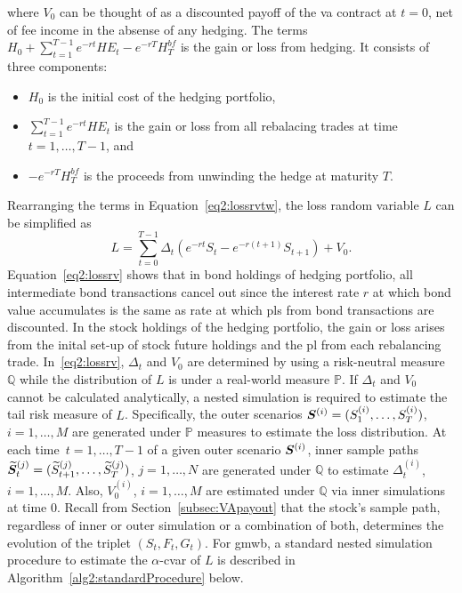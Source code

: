 where $V_0$ can be thought of as a discounted payoff of the \gls{va} contract at $t=0$, net of fee income in the absense of any hedging.
The terms $H_0 + \sum_{t=1}^{T-1} e^{-rt} HE_t - e^{-rT} H^{bf}_T$ is the gain or loss from hedging.
It consists of three components:
\begin{itemize}
    \item   $H_0$ is the initial cost of the hedging portfolio, 
    \item   $\sum_{t=1}^{T-1} e^{-rt} HE_t$ is the gain or loss from all rebalacing trades at time $t=1,\ldots,T-1$, and
    \item   $-e^{-rT} H^{bf}_T$ is the proceeds from unwinding the hedge at maturity $T$.
\end{itemize}
Rearranging the terms in Equation~\ref{eq2:lossrvtw}, the loss random variable $L$ can be simplified as
\begin{equation}\label{eq2:lossrv}
    L = \sum_{t=0}^{T-1}\Delta_t (e^{-rt}S_t - e^{-r(t+1)}S_{t+1}) + V_0.
\end{equation}
Equation~\ref{eq2:lossrv} shows that in bond holdings of hedging portfolio, all intermediate bond transactions cancel out since the interest rate $r$ at which bond value accumulates is the same as rate at which \gls{pl}s from bond transactions are discounted. 
In the stock holdings of the hedging portfolio, the gain or loss arises from the inital set-up of stock future holdings and the \gls{pl} from each rebalancing trade.
In~\eqref{eq2:lossrv}, $\Delta_t$ and $V_0$ are determined by using a risk-neutral measure $\mathbb{Q}$ while the distribution of $L$ is under a real-world measure $\mathbb{P}$.
If $\Delta_t$ and $V_0$ cannot be calculated analytically, a nested simulation is required to estimate the tail risk measure of $L$.
Specifically, the outer scenarios $\bm{S}^{(i)} = (S_{1}^{(i)},\ldots,S_{T}^{(i)})$, $i=1,\ldots,M$ are generated under $\mathbb{P}$ measures to estimate the loss distribution.
At each time~$t=1,\ldots,T-1$ of a given outer scenario $\bm{S}^{(i)}$, inner sample paths $\widetilde{\bm{S}}_{t}^{(j)} = (\widetilde{S}_{t+1}^{(j)},\ldots,\widetilde{S}_{T}^{(j)})$, $j=1,\ldots,N$ are generated under $\mathbb{Q}$ to estimate $\Delta_t^{(i)}$, $i=1,\ldots,M$.
Also, $V_0^{(i)}$, $i=1,\ldots,M$ are estimated under $\mathbb{Q}$ via inner simulations at time $0$.
Recall from Section~\ref{subsec:VApayout} that the stock's sample path, regardless of inner or outer simulation or a combination of both, determines the evolution of the triplet $(S_t,F_t,G_t)$.
For \gls{gmwb}, a standard nested simulation procedure to estimate the $\alpha$-\gls{cvar} of $L$ is described in Algorithm~\ref{alg2:standardProcedure} below.

